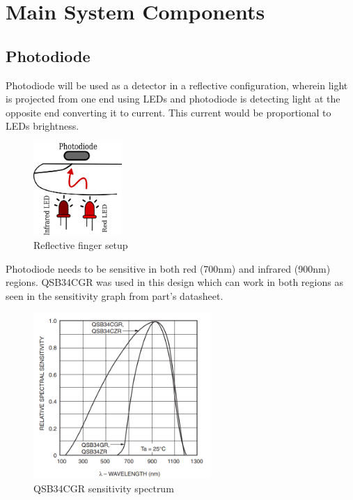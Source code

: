 \section{Main System Components}
	


	\subsection{Photodiode}
	
		Photodiode will be used as a detector in a reflective configuration, wherein light is projected from one end using LEDs and photodiode is detecting light at the opposite end converting it to current. This current would be proportional to LEDs brightness.
		
		
		\begin{figure}[ht!]
			\centering
			\includegraphics[width=0.3\textwidth]{images/finger_setup_en.png}
			\caption{Reflective finger setup}
		\end{figure}

		Photodiode needs to be sensitive in both red (700nm) and infrared (900nm) regions. QSB34CGR was used in this design which can work in both regions as seen in the sensitivity graph from part's datasheet.
	
		\begin{figure}[ht!]
			\centering
			\includegraphics[width=0.6\textwidth]{../common/QSBCGR.png}
			\caption{QSB34CGR sensitivity spectrum}
		\end{figure}
	
